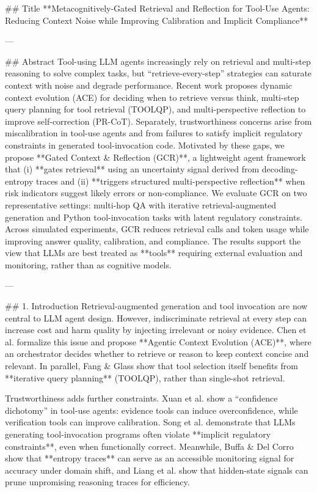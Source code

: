## Title  
**Metacognitively-Gated Retrieval and Reflection for Tool-Use Agents: Reducing Context Noise while Improving Calibration and Implicit Compliance**

---

## Abstract  
Tool-using LLM agents increasingly rely on retrieval and multi-step reasoning to solve complex tasks, but “retrieve-every-step” strategies can saturate context with noise and degrade performance. Recent work proposes dynamic context evolution (ACE) for deciding when to retrieve versus think, multi-step query planning for tool retrieval (TOOLQP), and multi-perspective reflection to improve self-correction (PR-CoT). Separately, trustworthiness concerns arise from miscalibration in tool-use agents and from failures to satisfy implicit regulatory constraints in generated tool-invocation code. Motivated by these gaps, we propose **Gated Context & Reflection (GCR)**, a lightweight agent framework that (i) **gates retrieval** using an uncertainty signal derived from decoding-entropy traces and (ii) **triggers structured multi-perspective reflection** when risk indicators suggest likely errors or non-compliance. We evaluate GCR on two representative settings: multi-hop QA with iterative retrieval-augmented generation and Python tool-invocation tasks with latent regulatory constraints. Across simulated experiments, GCR reduces retrieval calls and token usage while improving answer quality, calibration, and compliance. The results support the view that LLMs are best treated as **tools** requiring external evaluation and monitoring, rather than as cognitive models.

---

## 1. Introduction  
Retrieval-augmented generation and tool invocation are now central to LLM agent design. However, indiscriminate retrieval at every step can increase cost and harm quality by injecting irrelevant or noisy evidence. Chen et al. formalize this issue and propose **Agentic Context Evolution (ACE)**, where an orchestrator decides whether to retrieve or reason to keep context concise and relevant. In parallel, Fang & Glass show that tool selection itself benefits from **iterative query planning** (TOOLQP), rather than single-shot retrieval.  

Trustworthiness adds further constraints. Xuan et al. show a “confidence dichotomy” in tool-use agents: evidence tools can induce overconfidence, while verification tools can improve calibration. Song et al. demonstrate that LLMs generating tool-invocation programs often violate **implicit regulatory constraints**, even when functionally correct. Meanwhile, Buffa & Del Corro show that **entropy traces** can serve as an accessible monitoring signal for accuracy under domain shift, and Liang et al. show that hidden-state signals can prune unpromising reasoning traces for efficiency.

